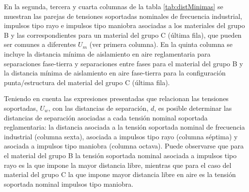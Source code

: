             En la segunda, tercera y cuarta columnas de la tabla \ref{tab:distMinimas} se muestran las parejas de tensiones soportadas nominales de frecuencia industrial, impulsos tipo rayo e impulsos tipo maniobra asociadas a los materiales del grupo B y las correspondientes para un material del grupo C (última fila), que pueden ser comunes a diferentes $U_\textit{m}$ (ver primera columna). En la quinta columna se incluye la distancia mínima de aislamiento en aire reglamentaria para separaciones fase-tierra y separaciones entre fases para el material del grupo B y la distancia mínima de aislamiento en aire fase-tierra para la configuración punta/estructura del material del grupo C (última fila).\newline
            
            Teniendo en cuenta las expresiones presentadas que relacionan las tensiones soportadas, $U_\textit{w}$, con las distancias de separación, $d$, es posible determinar las distancias de separación asociadas a cada tensión nominal soportada reglamentaria: la distancia asociada a la tensión soportada nominal de frecuencia industrial (columna sexta), asociada a impulsos tipo rayo (columna séptima) y asociada a impulsos tipo maniobra (columna octava). Puede observarse que para el material del grupo B la tensión soportada nominal asociada a impulsos tipo rayo es la que impone la mayor distancia libre, mientras que para el caso del material del grupo C la que impone mayor distancia libre en aire es la tensión soportada nominal impulsos tipo maniobra.

